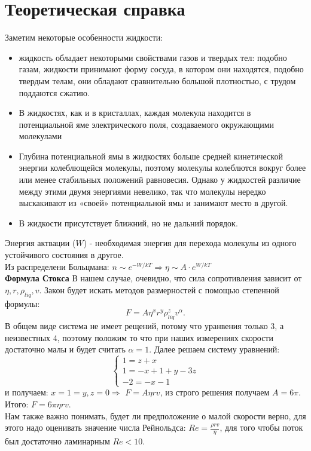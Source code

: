 \documentclass[12 pt, a4paper]{article}%
\begin{document}
\section*{Теоретическая справка}
Заметим некоторые особенности жидкости: 
\begin{itemize}
    \item жидкость обладает некоторыми свойствами газов и твердых тел: подобно газам, жидкости принимают форму сосуда, в котором они находятся, подобно твердым телам, они обладают сравнительно большой плотностью, с трудом поддаются сжатию.
    \item В жидкостях, как и в кристаллах, каждая молекула находится в потенциальной яме электрического поля, создаваемого окружающими молекулами
    \item  Глубина потенциальной ямы в жидкостях больше средней кинетической энергии колеблющейся молекулы, поэтому молекулы колеблются вокруг более или менее стабильных положений равновесия. Однако у жидкостей различие между этими двумя энергиями невелико, так что молекулы нередко выскакивают из «своей» потенциальной ямы и занимают место в другой.
    \item В жидкости присутствует ближний, но не дальний порядок.
\end{itemize}
Энергия актвации ($W$) - необходимая энергия для перехода молекулы из одного устойчивого состояния в другое. \\
Из распределени Больцмана: $n \sim e^{-W/kT} \Rightarrow \eta \sim A\cdot e^{W/kT}$ \\
\textbf{Формула Стокса} В нашем случае, очевидно, что сила сопротивления зависит от $\eta, r, \rho_{liq}, v$. Закон будет искать методов размерностей с помощью степенной формулы: $$F = A \eta^x r^y \rho_{liq}^z v^{\alpha}.$$ В общем виде система не имеет рещений, потому что уранвения только 3, а неизвестных 4, поэтому положим то что при наших измерениях скорости достаточно малы и будет считать $\alpha = 1$. Далее решаем систему уравнений: 
\begin{equation*}
 \begin{cases}
   1 = z + x
   \\
   1 = -x + 1 + y - 3z
   \\
   -2 = -x - 1
 \end{cases}
\end{equation*} и получаем: $x = 1 = y, z = 0 \Rightarrow$ $F = A \eta r v$, из строго решения получаем $A = 6\pi$. Итого: $F = 6\pi \eta r v$. \\
Нам также важно понимать, будет ли предположение о малой скорости верно, для этого надо оценивать значение числа Рейнольдса: $Re = \frac{\rho r v}{\eta}$, для того чтобы поток был достаточно ламинарным $Re < 10$.
\end{document}
